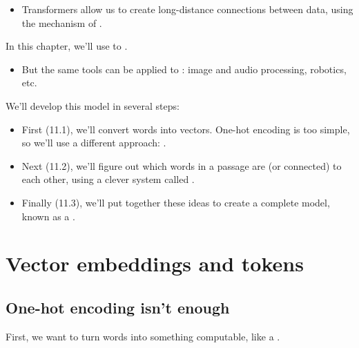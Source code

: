     \begin{itemize}
        \item Transformers allow us to create long-distance connections between data, using the mechanism of .\\
    \end{itemize}

    \begin{clarification}
        In this chapter, we'll use  to .

        \begin{itemize}
            \item But the same tools can be applied to : image and audio processing, robotics, etc.
        \end{itemize}
    \end{clarification}


    We'll develop this model in several steps:

    \begin{itemize}
        \item First (11.1), we'll convert words into vectors. One-hot encoding is too simple, so we'll use a different approach: .

        \item Next (11.2), we'll figure out which words in a passage are (or connected) to each other, using a clever system called .

        \item Finally (11.3), we'll put together these ideas to create a complete model, known as a .
    \end{itemize}






\pagebreak
\section{Vector embeddings and tokens}

    \subsection{One-hot encoding isn't enough}

        First, we want to turn words into something computable, like a .
    
